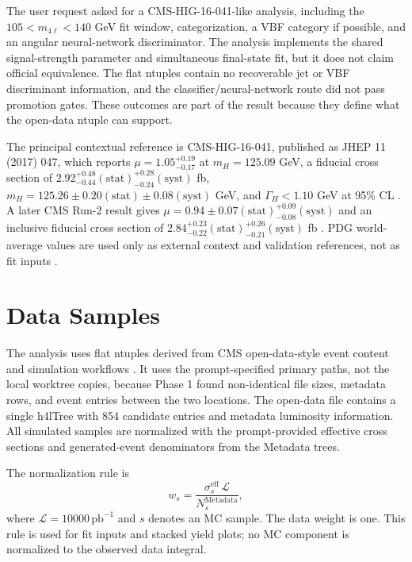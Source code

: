 \documentclass[11pt]{article}
\begin{document}
The user request asked for a CMS-HIG-16-041-like analysis, including the $105<m_{4\ell}<140$ GeV fit window, categorization, a VBF category if possible, and an angular neural-network discriminator. The analysis implements the shared signal-strength parameter and simultaneous final-state fit, but it does not claim official equivalence. The flat ntuples contain no recoverable jet or VBF discriminant information, and the classifier/neural-network route did not pass promotion gates. These outcomes are part of the result because they define what the open-data ntuple can support.

The principal contextual reference is CMS-HIG-16-041, published as JHEP 11 (2017) 047, which reports $\mu=1.05^{+0.19}_{-0.17}$ at $m_H=125.09$ GeV, a fiducial cross section of $2.92^{+0.48}_{-0.44}\mathrm{(stat)}^{+0.28}_{-0.24}\mathrm{(syst)}$ fb, $m_H=125.26\pm0.20\mathrm{(stat)}\pm0.08\mathrm{(syst)}$ GeV, and $\Gamma_H<1.10$ GeV at 95\% CL \cite{CMS-HIG-16-041}. A later CMS Run-2 result gives $\mu=0.94\pm0.07\mathrm{(stat)}^{+0.09}_{-0.08}\mathrm{(syst)}$ and an inclusive fiducial cross section of $2.84^{+0.23}_{-0.22}\mathrm{(stat)}^{+0.26}_{-0.21}\mathrm{(syst)}$ fb \cite{CMS-HIG-19-001}. PDG world-average values are used only as external context and validation references, not as fit inputs \cite{PDG2024}.
\section{Data Samples}
The analysis uses flat ntuples derived from CMS open-data-style event content and simulation workflows \cite{CMSDetector,CMSOpenData,GEANT4,PYTHIA8,POWHEG}. It uses the prompt-specified primary paths, not the local worktree copies, because Phase 1 found non-identical file sizes, metadata rows, and event entries between the two locations. The open-data file contains a single h4lTree with 854 candidate entries and metadata luminosity information. All simulated samples are normalized with the prompt-provided effective cross sections and generated-event denominators from the Metadata trees.

The normalization rule is
\begin{equation}
 w_s = \frac{\sigma^{\mathrm{eff}}_s\,\mathcal{L}}{N^{\mathrm{Metadata}}_s},
 \label{eq:mc-weight}
\end{equation}
where $\mathcal{L}=10000\,\mathrm{pb}^{-1}$ and $s$ denotes an MC sample. The data weight is one. This rule is used for fit inputs and stacked yield plots; no MC component is normalized to the observed data integral.
\end{document}
